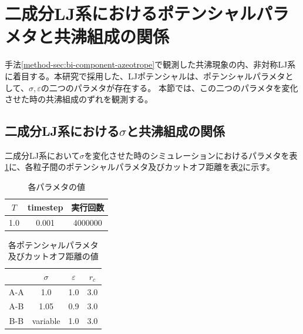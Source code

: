 \documentclass[titlepage]{jsreport}
\begin{document}
\section{二成分LJ系におけるポテンシャルパラメタと共沸組成の関係} \label{method-sec:bi-component-potential-parameter-azeotrope-ratio}
手法\ref{method-sec:bi-component-azeotrope}で観測した共沸現象の内、非対称LJ系に着目する。本研究で採用した、LJポテンシャルは、ポテンシャルパラメタとして、${\sigma}$,\,${\varepsilon}$の二つのパラメタが存在する。
本節では、この二つのパラメタを変化させた時の共沸組成のずれを観測する。


\subsection{二成分LJ系における$\sigma$と共沸組成の関係} \label{method-subsec:bi-component-sigma-azeotrope-ratio}
二成分LJ系において${\sigma}$を変化させた時のシミュレーションにおけるパラメタを表\ref{table:bi-component-sigma-azeotrope-ratio-parameter}に、各粒子間のポテンシャルパラメタ及びカットオフ距離を表\ref{table:bi-component-sigma-azeotrope-ratio-potential-parameter}に示す。

\begin{table}[htbp]
    \begin{center}
        \caption{各パラメタの値}
        \label{table:bi-component-sigma-azeotrope-ratio-parameter}
        \begin{tabular}{c c c}
            $T$ & timestep & 実行回数 \\
            \hline
            1.0 & 0.001 & 4000000 \\
        \end{tabular}
    \end{center}
\end{table}

\begin{table}[htbp]
    \begin{center}
        \caption{各ポテンシャルパラメタ及びカットオフ距離の値}
        \label{table:bi-component-sigma-azeotrope-ratio-potential-parameter}
        \begin{tabular}{c c c c}
            & $\sigma$ & $\varepsilon$ & $r_c$ \\
            \hline
            A-A & 1.0 & 1.0 & 3.0 \\
            A-B & 1.05 & 0.9 & 3.0 \\
            B-B & variable & 1.0 & 3.0
        \end{tabular}
    \end{center}
\end{table}
\end{document}
